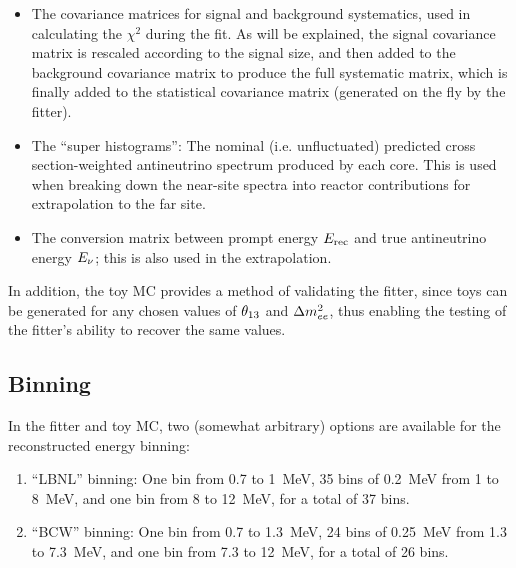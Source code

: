 \documentclass[../thesis.tex]{subfiles}
\begin{document}
\begin{itemize}
\item The covariance matrices for signal and background systematics, used in calculating the $\chi^2$ during the fit. As will be explained, the signal covariance matrix is rescaled according to the signal size, and then added to the background covariance matrix to produce the full systematic matrix, which is finally added to the statistical covariance matrix (generated on the fly by the fitter).
\item The ``super histograms'': The nominal (i.e. unfluctuated) predicted cross section-weighted antineutrino spectrum produced by each core. This is used when breaking down the near-site spectra into reactor contributions for extrapolation to the far site.
\item The conversion matrix between prompt energy $E_\mathrm{rec}$ and true antineutrino energy $E_\mathrm{\nu}$; this is also used in the extrapolation.
\end{itemize}

In addition, the toy MC provides a method of validating the fitter, since toys can be generated for any chosen values of $\theta_{13}$ and $\Delta m^2_{ee}$, thus enabling the testing of the fitter's ability to recover the same values.

\begin{comment}
  The toy MC also generates a ``PredictedIBD'' file which contains the background-free no-oscillation IBD spectra of each detector. As far as I can tell, this is only used in order to calculate a `summed' covariance matrix in which the matrices of the three stages (6, 8, 7AD) are combined, with the weighting determined by the PredictedIBD counts. (Oscillations shouldn't affect this weighting between ADs in the same hall, or the weighting between different stages.) In turn, the summed matrix is not used during the fit, but is only produced as a diagnostic. 
\end{comment}

\subsection{Binning}
\label{sec:fitBinning}

In the fitter and toy MC, two (somewhat arbitrary) options are available for the reconstructed energy binning:

\begin{enumerate}
\item ``LBNL'' binning: One bin from 0.7 to 1~MeV, 35 bins of 0.2~MeV from 1 to 8~MeV, and one bin from 8 to 12~MeV, for a total of 37 bins.
\item ``BCW'' binning: One bin from 0.7 to 1.3~MeV, 24 bins of 0.25~MeV from 1.3 to 7.3~MeV, and one bin from 7.3 to 12~MeV, for a total of 26 bins.
\end{enumerate}
\end{document}
